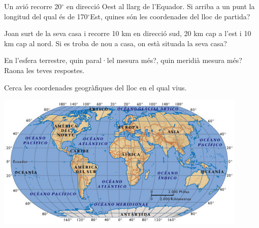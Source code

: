 \begin{mylist}
\exer Un avió recorre 20${}^\circ$ en direcció Oest al llarg de l'Equador. Si arriba a un punt la longitud del qual és de 170${}^\circ$Est, quines són les coordenades del lloc de partida?


\exer  Joan surt de la seva casa i recorre 10 km en direcció sud, 20 km cap a l'est i 10 km cap al nord. Si es troba de nou a casa, on està situada la seva casa?


\exer  En l'esfera terrestre, quin paral·lel mesura més?, quin meridià mesura més? Raona les teves respostes.


\exer  Cerca les coordenades geogràfiques del lloc en el qual vius.


\begin{center}
 \includegraphics*[width=12cm]{img-11/planisferi.png} 
\end{center} 

 
\end{mylist}



